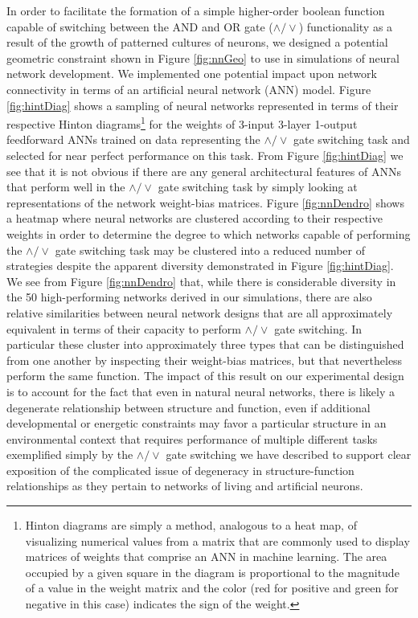 In order to facilitate the formation of a simple higher-order boolean function capable of switching between the AND and OR gate ($\wedge / \vee$) functionality as a result of the growth of patterned cultures of neurons, we designed a potential geometric constraint shown in Figure \ref{fig:nnGeo} to use in simulations of neural network development. We implemented one potential impact upon network connectivity in terms of an artificial neural network (ANN) model. Figure \ref{fig:hintDiag} shows a sampling of neural networks represented in terms of their respective Hinton diagrams\footnote{Hinton diagrams are simply a method, analogous to a heat map, of visualizing numerical values from a matrix that are commonly used to display matrices of weights that comprise an ANN in machine learning. The area occupied by a given square in the diagram is proportional to the magnitude of a value in the weight matrix and the color (red for positive and green for negative in this case) indicates the sign of the weight.} for the weights of 3-input 3-layer 1-output feedforward ANNs trained on data representing the $\wedge / \vee$ gate switching task and selected for near perfect performance on this task. From Figure \ref{fig:hintDiag} we see that it is not obvious if there are any general architectural features of ANNs that perform well in the $\wedge / \vee$ gate switching task by simply looking at representations of the network weight-bias matrices. Figure \ref{fig:nnDendro} shows a heatmap where neural networks are clustered according to their respective weights in order to determine the degree to which networks capable of performing the $\wedge / \vee$ gate switching task may be clustered into a reduced number of strategies despite the apparent diversity demonstrated in Figure \ref{fig:hintDiag}. We see from Figure \ref{fig:nnDendro} that, while there is considerable diversity in the 50 high-performing networks derived in our simulations, there are also relative similarities between neural network designs that are all approximately equivalent in terms of their capacity to perform $\wedge / \vee$ gate switching. In particular these cluster into approximately three types that can be distinguished from one another by inspecting their weight-bias matrices, but that nevertheless perform the same function. The impact of this result on our experimental design is to account for the fact that even in natural neural networks, there is likely a degenerate relationship between structure and function, even if additional developmental or energetic constraints may favor a particular structure in an environmental context that requires performance of multiple different tasks exemplified simply by the $\wedge / \vee$ gate switching we have described to support clear exposition of the complicated issue of degeneracy in structure-function relationships as they pertain to networks of living and artificial neurons.

